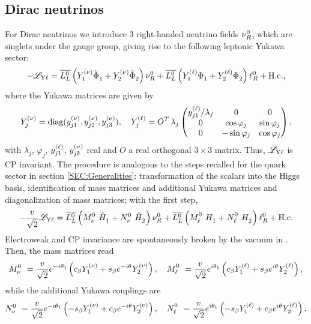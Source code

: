 \documentclass[12pt,a4paper]{article}
\begin{document}
\subsection{Dirac neutrinos\label{sSEC:Dirac}}
For Dirac neutrinos we introduce 3 right-handed neutrino fields $\nu_R^0$, which are singlets under the gauge group, giving rise to the following leptonic Yukawa sector:
\begin{equation}\label{eq:LYukLep:00}
 -\mathscr L_{\rm Y\ell}=\wLLb\left(\YN{1}\SDC{1}+\YN{2}\SDC{2}\right)\wNR+\wLLb\left(\YL{1}\SD{1}+\YL{2}\SD{2}\right)\wLR+\Hc,
\end{equation}
where the Yukawa matrices are given by
\begin{equation}\label{eq:YukLepMat:00}
Y_{j}^{\rm (\nu)}=\text{diag}(y_{j1}^{\rm (\nu)},y_{j2}^{\rm (\nu)},y_{j3}^{\rm (\nu)}), \quad Y_{j}^{\rm (\ell)} =O^T\,\lambda_j\begin{pmatrix}y_{j1}^{\rm (\ell)}/\lambda_j & 0 & 0\\ 0 & \cos\varphi_j & \sin\varphi_j\\ 0 & -\sin\varphi_j & \cos\varphi_j\end{pmatrix}, 
\end{equation}
with $\lambda_j$, $\varphi_j$, $y_{j1}^{\rm (\ell)}$, $y_{jk}^{\rm (\nu)}$ real and $O$ a real orthogonal $3\times 3$ matrix. Thus, $\mathscr L_{\rm Y\ell}$ is CP invariant. The procedure is analogous to the steps recalled for the quark sector in section \ref{SEC:Generalities}: transformation of the scalars into the Higgs basis, identification of mass matrices and additional Yukawa matrices and diagonalization of mass matrices; with the first step,
\begin{equation}\label{eq:LYukLep:01}
 -\frac{\vev{}}{\sqrt{2}}\mathscr L_{\rm Y\ell}=\wLLb\left(\wMN\HSDC{1}+\wNN\HSDC{2}\right)\wNR+\wLLb\left(\wML\HSD{1}+\wNL\HSD{2}\right)\wLR+\Hc
\end{equation}
Electroweak and CP invariance are spontaneously broken by the vacuum in . Then, the mass matrices read
\begin{equation}\label{eq:MassMatricesLep:00}
 \wMN=\frac{\vev{}}{\sqrt 2}e^{-i\vevPh{1}}\left(\Cb\YN{1}+\Sb e^{-i\vevPh{}}\YN{2}\right),\quad 
 \wML=\frac{\vev{}}{\sqrt 2}e^{i\vevPh{1}}\left(\Cb\YL{1}+\Sb e^{i\vevPh{}}\YL{2}\right),
\end{equation}
while the additional Yukawa couplings are
\begin{equation}\label{eq:NMatricesLep:00}
\wNN=\frac{\vev{}}{\sqrt 2}e^{-i\vevPh{1}}\left(-\Sb\YN{1}+\Cb e^{-i\vevPh{}}\YN{2}\right),\quad 
\wNL=\frac{\vev{}}{\sqrt 2}e^{i\vevPh{1}}\left(-\Sb\YL{1}+\Cb e^{i\vevPh{}}\YL{2}\right).
\end{equation}
\end{document}
